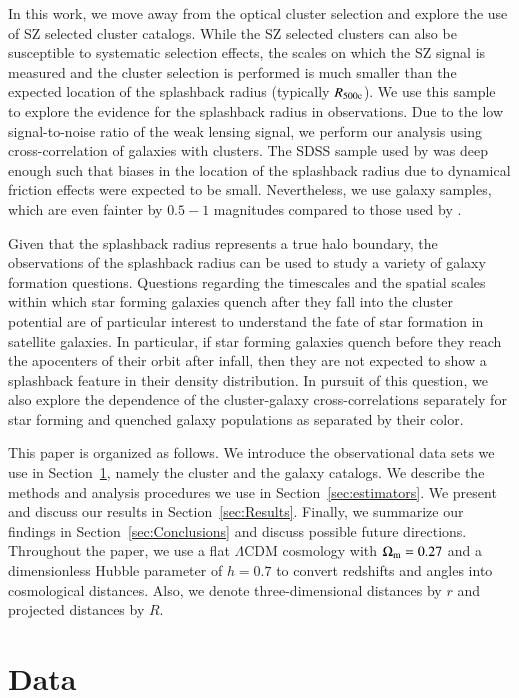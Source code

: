 \documentclass[iop, apjl, twocolappendix, numberedappendix]{emulateapj}
\begin{document}
In this work, we move away from the optical cluster selection and
explore the use of SZ selected cluster catalogs. While the SZ
selected clusters can also be susceptible to systematic selection
effects, the scales on which the SZ signal is measured and the
cluster selection is performed is much smaller than the expected
location of the splashback radius (typically $R_{\rm 500c}$). We use
this sample to explore the evidence for the splashback radius in
observations.  Due to the low signal-to-noise ratio of the weak
lensing signal, we perform our analysis using cross-correlation of
galaxies with clusters.  The SDSS sample used by
\citet{more2016detection} was deep enough such that biases in the
location of the splashback radius due to dynamical friction effects
were expected to be small.  Nevertheless, we use galaxy samples, which
are even fainter by $0.5-1$ magnitudes compared to those used by
\citet{more2016detection}.

Given that the splashback radius represents a true halo boundary,
the observations of the splashback radius can be used to study a
variety of galaxy formation questions. Questions regarding the
timescales and the spatial scales within which star forming galaxies
quench after they fall into the cluster potential are of particular
interest to understand the fate of star formation in satellite
galaxies. In particular, if star forming galaxies quench before they
reach the apocenters of their orbit after infall, then they are not
expected to show a splashback feature in their density distribution.
In pursuit of this question, we also explore the dependence of the
cluster-galaxy cross-correlations separately for star forming and
quenched galaxy populations as separated by their color.

This paper is organized as follows. We introduce the observational
data sets we use in Section~\ref{sec:data}, namely the cluster and the
galaxy catalogs. We describe the methods and analysis procedures we
use in Section~\ref{sec:estimators}. We present and discuss our
results in Section~\ref{sec:Results}. Finally, we summarize our
findings in Section~\ref{sec:Conclusions} and discuss possible future
directions. Throughout the paper, we use a flat $\Lambda$CDM cosmology
with $\Omega_{\rm m}=0.27$ and a dimensionless Hubble parameter of $h=0.7$ 
to convert redshifts and angles into
cosmological distances. Also, we denote three-dimensional distances by
$r$ and projected distances by $R$.


\section{Data}
\label{sec:data}
\end{document}

